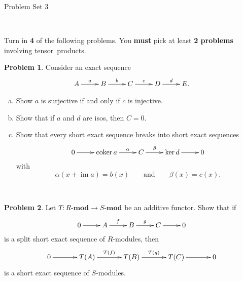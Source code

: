 \documentclass[11pt]{article}
\title{}
\date{\vspace{-0.5in}}
\DeclareMathOperator{\coker}{coker}
\DeclareMathOperator{\im}{im}
\theoremstyle{definition}
\newtheorem{problem}{Problem}
\begin{document}
\thispagestyle{fancy}
\pagestyle{fancy}

\vspace{3em}

\begin{center}
	{\LARGE Problem Set 3}
\end{center}


\


\noindent
Turn in {\bf 4} of the following problems. You {\bf must} pick at least {\bf 2 problems} involving tensor~products.

%
\noindent

\vspace{2em}

\begin{problem}
Consider an exact sequence
$$\xymatrix{A \ar[r]^-a & B \ar[r]^-b & C \ar[r]^-c & D \ar[r]^-d & E.}$$

\begin{enumerate}[a)]
	\item Show $a$ is surjective if and only if $c$ is injective.
\item Show that if $a$ and $d$ are isos, then $C = 0$.
\item Show that every short exact sequence
breaks into short exact sequences
$$\xymatrix{0 \ar[r] & \coker a \ar[r]^-\alpha & C \ar[r]^-\beta & \ker d \ar[r] & 0}$$
with
$$\alpha(x + \im a) = b(x) \qquad \textrm{and} \qquad \beta(x) = c(x).$$
\end{enumerate}
\end{problem}


\

\begin{problem}
	Let $T\!: R\textbf{-mod} \longrightarrow S\textbf{-mod}$ be an additive functor. Show that if
	$$\xymatrix{0 \ar[r] & A \ar[r]^-f & B \ar[r]^-g & C \ar[r] & 0}$$
	is a split short exact sequence of $R$-modules, then 
	$$\xymatrix@C=12mm{0 \ar[r] & T(A) \ar[r]^-{T(f)} & T(B) \ar[r]^-{T(g)} & T(C) \ar[r] & 0}$$
is a short exact sequence of $S$-modules.
\end{problem}
\end{document}
